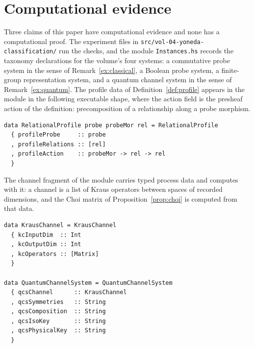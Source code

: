 \documentclass[11pt,letterpaper]{article}
\theoremstyle{definition}
\theoremstyle{remark}
\begin{document}
\section{Computational evidence}
\label{sec:computation}

Three claims of this paper have computational evidence and none has a computational proof. The experiment files in \texttt{src/vol-04-yoneda-classification/} run the checks, and the module \texttt{Instances.hs} records the taxonomy declarations for the volume's four systems: a commutative probe system in the sense of Remark~\ref{ex:classical}, a Boolean probe system, a finite-group representation system, and a quantum channel system in the sense of Remark~\ref{ex:quantum}. The profile data of Definition~\ref{def:profile} appears in the module in the following executable shape, where the action field is the presheaf action of the definition: precomposition of a relationship along a probe morphism.

\begin{lstlisting}
data RelationalProfile probe probeMor rel = RelationalProfile
  { profileProbe     :: probe
  , profileRelations :: [rel]
  , profileAction    :: probeMor -> rel -> rel
  }
\end{lstlisting}

The channel fragment of the module carries typed process data and computes with it: a channel is a list of Kraus operators between spaces of recorded dimensions, and the Choi matrix of Proposition~\ref{prop:choi} is computed from that data.

\begin{lstlisting}
data KrausChannel = KrausChannel
  { kcInputDim  :: Int
  , kcOutputDim :: Int
  , kcOperators :: [Matrix]
  }

data QuantumChannelSystem = QuantumChannelSystem
  { qcsChannel      :: KrausChannel
  , qcsSymmetries   :: String
  , qcsComposition  :: String
  , qcsIsoKey       :: String
  , qcsPhysicalKey  :: String
  }
\end{lstlisting}
\end{document}
